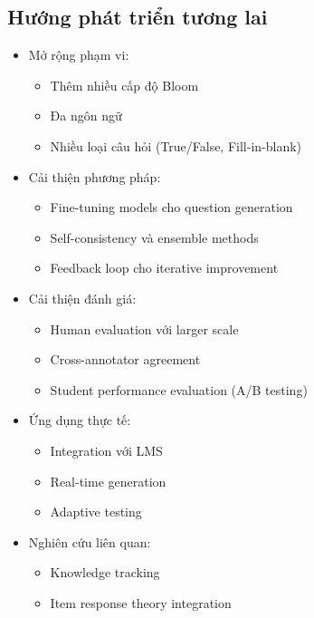 \subsection{Hướng phát triển tương lai}
\begin{itemize}
    \item Mở rộng phạm vi:
    \begin{itemize}
        \item Thêm nhiều cấp độ Bloom
        \item Đa ngôn ngữ
        \item Nhiều loại câu hỏi (True/False, Fill-in-blank)
    \end{itemize}
    \item Cải thiện phương pháp:
    \begin{itemize}
        \item Fine-tuning models cho question generation
        \item Self-consistency và ensemble methods
        \item Feedback loop cho iterative improvement
    \end{itemize}
    \item Cải thiện đánh giá:
    \begin{itemize}
        \item Human evaluation với larger scale
        \item Cross-annotator agreement
        \item Student performance evaluation (A/B testing)
    \end{itemize}
    \item Ứng dụng thực tế:
    \begin{itemize}
        \item Integration với LMS
        \item Real-time generation
        \item Adaptive testing
    \end{itemize}
    \item Nghiên cứu liên quan:
    \begin{itemize}
        \item Knowledge tracking
        \item Item response theory integration
    \end{itemize}
\end{itemize}
